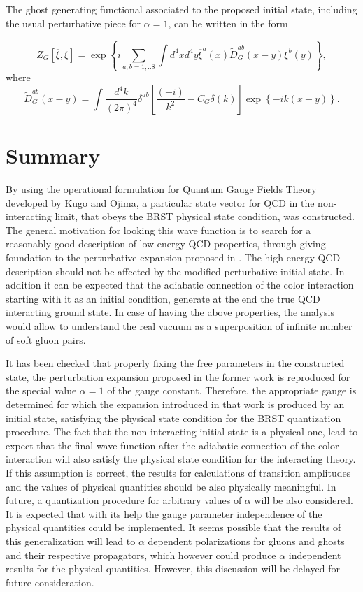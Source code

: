 \documentclass[12pt,letterpaper]{report}
\begin{document}
The ghost generating functional associated to the proposed initial
state, including the usual perturbative piece for $\alpha =1$, can
be written in the form

\begin{equation}
Z_G[\overline{\xi },\xi ]=\exp \left\{
i\sum\limits_{a,b=1,..8}\int d^4xd^4y \overline{\xi }^a\left(
x\right) \widetilde{D}_G^{ab}(x-y)\xi ^b\left(y\right) \right\},
\end{equation}
where
\begin{equation}
\widetilde{D}_G^{ab}(x-y)=\int \frac{d^4k}{\left(2\pi \right)
^4}\delta ^{ab}\left[ \frac{\left(-i\right) }{k^2}-C_G\delta
\left(k\right) \right] \exp \left\{ -ik\left(x-y\right) \right\}.
\end{equation}

\chapter{Summary}

By using the operational formulation for Quantum Gauge Fields
Theory developed by Kugo and Ojima, a particular state vector for
QCD in the non-interacting limit, that obeys the BRST physical
state condition, was constructed. The general motivation for
looking this wave function is to search for a reasonably good
description of low energy QCD properties, through giving
foundation to the perturbative expansion proposed in \cite{Cabo}.
The high energy QCD description should not be affected by the
modified perturbative initial state. In addition it can be
expected that the adiabatic connection of the color interaction
starting with it as an initial condition, generate at the end the
true QCD interacting ground state. In case of having the above
properties, the analysis would allow to understand the real vacuum
as a superposition of infinite number of soft gluon pairs.

It has been checked that properly fixing the free parameters in
the constructed state, the perturbation expansion proposed in the
former work \cite{Cabo} is reproduced for the special value
$\alpha =1$ of the gauge constant. Therefore, the appropriate
gauge is determined for which the expansion introduced in that
work is produced by an initial state, satisfying the physical
state condition for the BRST quantization procedure. The fact that
the non-interacting initial state is a physical one, lead to
expect that the final wave-function after the adiabatic connection
of the color interaction will also satisfy the physical state
condition for the interacting theory. If this assumption is
correct, the results for calculations of transition amplitudes and
the values of physical quantities should be also physically
meaningful. In future, a quantization procedure for arbitrary
values of $\alpha$ will be also considered. It is expected that
with its help the gauge parameter independence of the physical
quantities could be implemented. It seems possible that the
results of this generalization will lead to $\alpha $ dependent
polarizations for gluons and ghosts and their respective
propagators, which however could produce $\alpha $ independent
results for the physical quantities. However, this discussion will
be delayed for future consideration.
\end{document}
